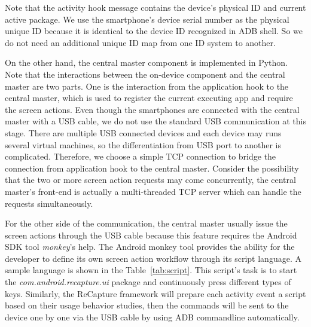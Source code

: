 Note that the activity hook message contains the device's physical ID and current active package. We use the smartphone's device serial number as the physical unique ID because it is identical to the device ID recognized in ADB shell. So we do not need an additional unique ID map from one ID system to another.

On the other hand, the central master component is implemented in Python. Note that the interactions between the on-device component and the central master are two parts. One is the interaction from the application hook to the central master, which is used to register the current executing app and require the screen actions. Even though the smartphones are connected with the central master with a USB cable, we do not use the standard USB communication at this stage. There are multiple USB connected devices and each device may runs several virtual machines, so the differentiation from USB port to another is complicated. Therefore, we choose a simple TCP connection to bridge the connection from application hook to the central master. Consider the possibility that the two or more screen action requests may come concurrently, the central master's front-end is actually a multi-threaded TCP server which can handle the requests simultaneously.

For the other side of the communication, the central master usually issue the screen actions through the USB cable because this feature requires the Android SDK tool \emph{monkey}'s help. The Android monkey tool provides the ability for the developer to define its own screen action workflow through its script language. A sample language is shown in the Table~\ref{tab:script}. This script's task is to start the \emph{com.android.recapture.ui} package and continuously press different types of keys. Similarly, the ReCapture framework will prepare each activity event a script based on their usage behavior studies, then the commands will be sent to the device one by one via the USB cable by using ADB commandline automatically.

